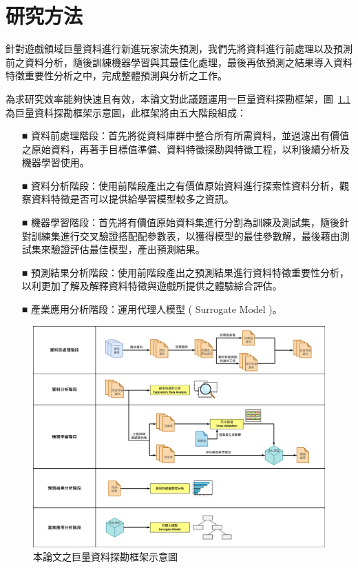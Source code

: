 \chapter{研究方法}
\label{cha:Method}

針對遊戲領域巨量資料進行新進玩家流失預測，我們先將資料進行前處理以及預測前之資料分析，隨後訓練機器學習與其最佳化處理，最後再依預測之結果導入資料特徵重要性分析之中，完成整體預測與分析之工作。

為求研究效率能夠快速且有效，本論文對此議題運用一巨量資料探勘框架，圖~\ref{fig:Image_Framework} 為巨量資料探勘框架示意圖，此框架將由五大階段組成：

\begin{itemize}
  \item[■] 資料前處理階段：首先將從資料庫群中整合所有所需資料，並過濾出有價值之原始資料，再著手目標值準備、資料特徵探勘與特徵工程，以利後續分析及機器學習使用。
  \item[■] 資料分析階段：使用前階段產出之有價值原始資料進行探索性資料分析，觀察資料特徵是否可以提供給學習模型較多之資訊。
  \item[■] 機器學習階段：首先將有價值原始資料集進行分割為訓練及測試集，隨後針對訓練集進行交叉驗證搭配配參數表，以獲得模型的最佳參數解，最後藉由測試集來驗證評估最佳模型，產出預測結果。
  \item[■] 預測結果分析階段：使用前階段產出之預測結果進行資料特徵重要性分析，以利更加了解及解釋資料特徵與遊戲所提供之體驗綜合評估。
  \item[■] 產業應用分析階段：運用代理人模型 ( Surrogate Model )。
\end{itemize} 

\begin{figure}[!htb]
  \begin{center}
    \includegraphics[width=1\textwidth]{figures/Image_Framework.png}
    \caption[本論文之巨量資料探勘框架示意圖]{本論文之巨量資料探勘框架示意圖}
    \label{fig:Image_Framework}
  \end{center}
\end{figure}

